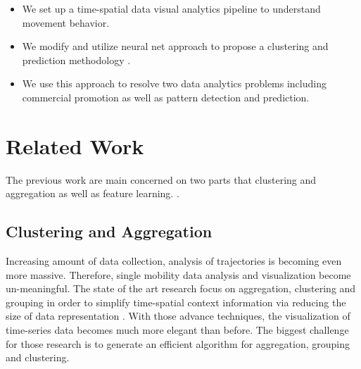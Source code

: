 \documentclass[runningheads,a4paper]{llncs}
\begin{document}
\begin{itemize}
\item We set up a time-spatial data visual analytics pipeline to understand movement behavior.

\item We modify and utilize neural net approach to propose a clustering and prediction methodology .

\item We use this approach to resolve two data analytics problems including commercial promotion as well as pattern detection and prediction.

\end{itemize}
\section{Related Work}
The previous work are main concerned on two parts that clustering and aggregation as well as feature learning.\cite{zheng2009mining} \cite{andrienko2013visual}.

\subsection{Clustering and Aggregation}
Increasing amount of data collection, analysis of trajectories is becoming even more massive. Therefore, single mobility data analysis and visualization become un-meaningful. The state of the art research focus on aggregation, clustering and grouping in order to simplify time-spatial context information via reducing the size of data representation  \cite{von2016mobilitygraphs}. With those advance techniques, the visualization of time-series data becomes much more elegant than before. The biggest challenge for those research is to generate an efficient algorithm for aggregation, grouping and clustering.
\end{document}
